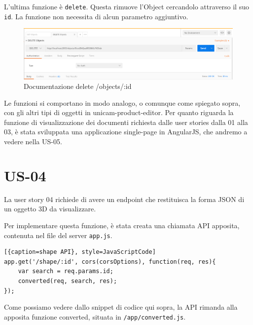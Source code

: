 L'ultima funzione è \texttt{delete}. Questa rimuove l'Object cercandolo attraverso il suo \texttt{id}. La funzione non necessita di alcun parametro aggiuntivo.
\begin{figure}[h]
	\centering
	\includegraphics[scale=0.42]{Immagini/delete_objects.png}
	\caption{Documentazione delete /objects/:id}
\end{figure}

Le funzioni si comportano in modo analogo, o comunque come spiegato sopra, con gli altri tipi di oggetti in unicam-product-editor.
Per quanto riguarda la funzione di visualizzazione dei documenti richiesta dalle user stories dalla 01 alla 03, è stata sviluppata una applicazione single-page in AngularJS, che andremo a vedere nella US-05.
\section{US-04}
La user story 04 richiede di avere un endpoint che restituisca la forma JSON di un oggetto 3D da visualizzare.

Per implementare questa funzione, è stata creata una chiamata API apposita, contenuta nel file del server \texttt{app.js}.

\begin{lstlisting}[{caption=shape API}, style=JavaScriptCode]
app.get('/shape/:id', cors(corsOptions), function(req, res){
	var search = req.params.id;
	converted(req, search, res);
});
\end{lstlisting}
Come possiamo vedere dallo snippet di codice qui sopra, la API rimanda alla apposita funzione converted, situata in \texttt{/app/converted.js}.

